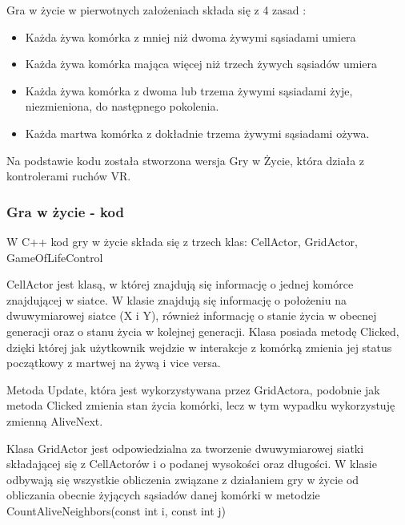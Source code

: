 \documentclass[a4paper,12pt,reqno]{article}
\begin{document}
Gra w życie w pierwotnych założeniach składa się z 4 zasad \cite{game_of_life_story}:

\begin{itemize}
\item Każda żywa komórka z mniej niż dwoma żywymi sąsiadami umiera
\item Każda żywa komórka mająca więcej niż trzech żywych sąsiadów umiera
\item Każda żywa komórka z dwoma lub trzema żywymi sąsiadami żyje, niezmieniona, do następnego pokolenia.
\item Każda martwa komórka z dokładnie trzema żywymi sąsiadami ożywa.
\end{itemize}


Na podstawie kodu \cite{game_of_life_code} została stworzona wersja Gry w Życie, która działa z kontrolerami ruchów VR.
\subsubsection{Gra w życie - kod}

W C++ kod gry w życie składa się z trzech klas: CellActor, GridActor, GameOfLifeControl

CellActor jest klasą, w której znajdują się informację o jednej komórce znajdującej w siatce. W klasie znajdują się informację o położeniu na dwuwymiarowej siatce (X i Y), również informację o stanie życia w obecnej generacji oraz o stanu życia w kolejnej generacji. Klasa posiada metodę Clicked, dzięki której jak użytkownik wejdzie w interakcje z komórką zmienia jej status początkowy z martwej na żywą i vice versa. 



Metoda Update, która jest wykorzystywana przez GridActora, podobnie jak metoda Clicked zmienia stan życia komórki, lecz w tym wypadku wykorzystuję zmienną AliveNext.




Klasa GridActor jest odpowiedzialna za tworzenie dwuwymiarowej siatki składającej się z CellActorów i o podanej wysokości oraz długości. W klasie odbywają się wszystkie obliczenia związane z działaniem gry w życie od obliczania obecnie żyjących sąsiadów danej komórki w metodzie CountAliveNeighbors(const int i, const int j)
\end{document}
